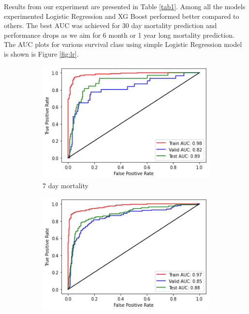 \documentclass[11pt,a4paper]{article}
\begin{document}
Results from our experiment are presented in Table \ref{tab1}.
Among all the models experimented Logistic Regression and XG Boost performed better compared to others. 
The best AUC was achieved for 30 day mortality prediction and performance drops as we aim for 6 month or 1 year long mortality prediction. The AUC plots for various survival class using simple Logistic Regression model is shown is Figure \ref{fig:lr}. 


\begin{figure}[h!]
	\centering
	\begin{subfigure}[b]{0.475\textwidth}
		\centering
		\includegraphics[width=\textwidth]{7d}
		\caption[Network2]%
		{{\small 7 day mortality}}    
		\label{fig:mean and std of net14}
	\end{subfigure}
	\hfill
	\begin{subfigure}[b]{0.475\textwidth}  
		\centering 
		\includegraphics[width=\textwidth]{30d}

\end{subfigure}
\end{figure}
\end{document}
